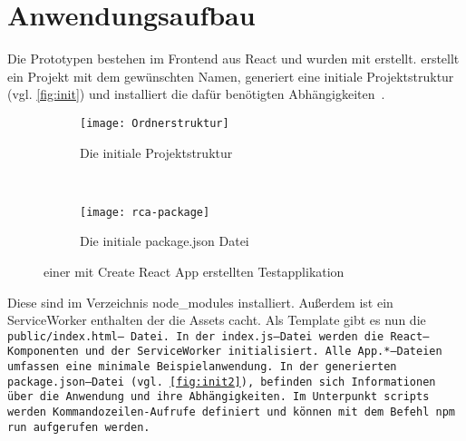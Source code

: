 \section{Anwendungsaufbau}
Die Prototypen bestehen im Frontend aus React und wurden mit  erstellt.  erstellt ein Projekt mit dem gewünschten Namen, generiert eine initiale Projektstruktur (vgl. \autoref{fig:init}) und installiert die dafür benötigten Abhängigkeiten~\cite{create-react}.
\begin{figure}[H]
  \centering
  \begin{subfigure}[t]{0.4\textwidth}
          \texttt{[image: Ordnerstruktur]}
          \caption{Die initiale Projektstruktur}
          \label{fig:init}
  \end{subfigure}
  ~ 
  \begin{subfigure}[t]{0.4\textwidth}
          \texttt{[image: rca-package]}
          \caption{Die initiale package.json Datei}
          \label{fig:init2}
  \end{subfigure}
  \grayRule
  \caption[Create React App: initiale Testapplikation]{einer mit Create React App erstellten Testapplikation}
  \label{fig:create-react-app}
\end{figure}
%
Diese sind im Verzeichnis node\_modules installiert.
Außerdem ist ein ServiceWorker
enthalten der die \gls{Assets} cacht.
Als Template gibt es nun die \tt{public/index.html}-- Datei. In der \tt{index.js}--Datei werden die React--Komponenten und der ServiceWorker initialisiert. 
Alle \tt{App.*}--Dateien umfassen eine minimale Beispielanwendung.
In der generierten \tt{package.json}--Datei (vgl. \autoref{fig:init2}), befinden sich Informationen über die Anwendung und ihre Abhängigkeiten. Im Unterpunkt \tt{scripts} werden Kommandozeilen-Aufrufe definiert und können mit dem Befehl \tt{npm run} aufgerufen werden.
%
%

%
%
%
